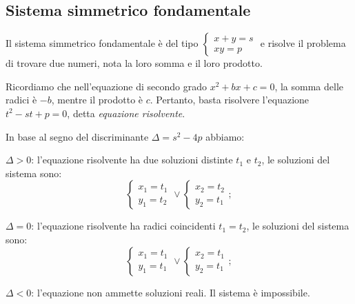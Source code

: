 \subsection{Sistema simmetrico fondamentale}

Il sistema simmetrico fondamentale è del tipo $\left\{\begin{array}{l}{x+y=s}\\{xy=p}\end{array}\right.$ e risolve il problema di trovare due numeri, nota la loro somma e il loro prodotto.

Ricordiamo che nell'equazione di secondo grado $x^2+bx+c=0$, la somma delle radici è $-b$, mentre il prodotto è $c$. Pertanto, basta risolvere l'equazione $t^2-st+p=0$, detta \emph{equazione risolvente}.

In base al segno del discriminante $\Delta = s^2-4p$ abbiamo:
\begin{itemize*}
\item $\Delta>0$: l'equazione risolvente ha due soluzioni distinte $t_1$ e $t_2$, le soluzioni del sistema sono: \[\left\{\begin{array}{l}{x_1=t_1}\\{y_1=t_2}\end{array}\right.\vee \left\{\begin{array}{l}{x_2=t_2}\\{y_2=t_1}\end{array}\right.;\]
\item $\Delta=0$: l'equazione risolvente ha radici coincidenti $t_1=t_2$, le soluzioni del sistema sono: \[\left\{\begin{array}{l}{x_1=t_1}\\{y_1=t_1}\end{array}\right.\vee \left\{\begin{array}{l}{x_2=t_1}\\{y_2=t_1}\end{array}\right.;\]
\item $\Delta<0$: l'equazione non ammette soluzioni reali. Il sistema è impossibile.
\end{itemize*}

